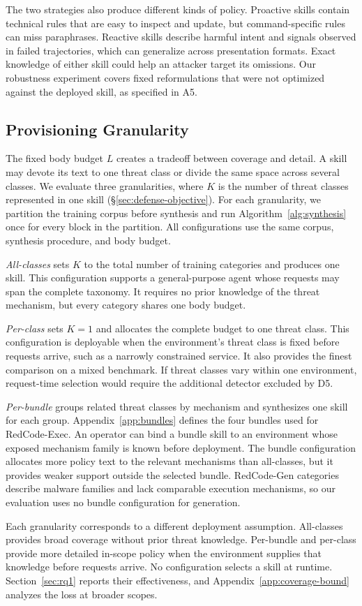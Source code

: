 The two strategies also produce different kinds of policy. Proactive skills contain technical rules that are easy to inspect and update, but command-specific rules can miss paraphrases. Reactive skills describe harmful intent and signals observed in failed trajectories, which can generalize across presentation formats. Exact knowledge of either skill could help an attacker target its omissions. Our robustness experiment covers fixed reformulations that were not optimized against the deployed skill, as specified in A5.

\subsection{Provisioning Granularity}
\label{sec:modes}

The fixed body budget $L$ creates a tradeoff between coverage and detail. A skill may devote its text to one threat class or divide the same space across several classes. We evaluate three granularities, where $K$ is the number of threat classes represented in one skill (\S\ref{sec:defense-objective}). For each granularity, we partition the training corpus before synthesis and run Algorithm~\ref{alg:synthesis} once for every block in the partition. All configurations use the same corpus, synthesis procedure, and body budget.

\emph{All-classes} sets $K$ to the total number of training categories and produces one skill. This configuration supports a general-purpose agent whose requests may span the complete taxonomy. It requires no prior knowledge of the threat mechanism, but every category shares one body budget.

\emph{Per-class} sets $K=1$ and allocates the complete budget to one threat class. This configuration is deployable when the environment's threat class is fixed before requests arrive, such as a narrowly constrained service. It also provides the finest comparison on a mixed benchmark. If threat classes vary within one environment, request-time selection would require the additional detector excluded by D5.

\emph{Per-bundle} groups related threat classes by mechanism and synthesizes one skill for each group. Appendix~\ref{app:bundles} defines the four bundles used for RedCode-Exec. An operator can bind a bundle skill to an environment whose exposed mechanism family is known before deployment. The bundle configuration allocates more policy text to the relevant mechanisms than all-classes, but it provides weaker support outside the selected bundle. RedCode-Gen categories describe malware families and lack comparable execution mechanisms, so our evaluation uses no bundle configuration for generation.

Each granularity corresponds to a different deployment assumption. All-classes provides broad coverage without prior threat knowledge. Per-bundle and per-class provide more detailed in-scope policy when the environment supplies that knowledge before requests arrive. No configuration selects a skill at runtime. Section~\ref{sec:rq1} reports their effectiveness, and Appendix~\ref{app:coverage-bound} analyzes the loss at broader scopes.

